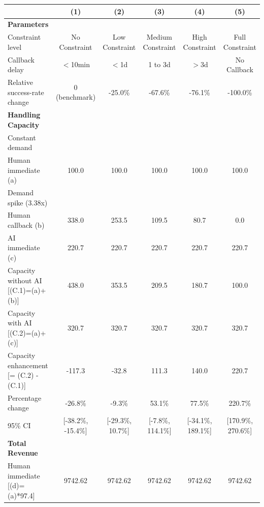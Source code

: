 \begin{tabular}{lccccc}
\toprule
 & (1) & (2) & (3) & (4) & (5) \\
\midrule
\textbf{Parameters} &  &  &  &  &  \\
\hspace{1em} Constraint level & No Constraint & Low Constraint & Medium Constraint & High Constraint & Full Constraint \\
\hspace{1em} Callback delay & $<$10min & $<$1d & 1 to 3d & $>$3d & No Callback \\
\hspace{1em} Relative success-rate change & 0 (benchmark) & -25.0\% & -67.6\% & -76.1\% & -100.0\% \\
\midrule
\textbf{Handling Capacity} &  &  &  &  &  \\
\hspace{1em} Constant demand &  &  &  &  &  \\
\hspace{2em} Human immediate (a) & 100.0 & 100.0 & 100.0 & 100.0 & 100.0 \\
\hspace{1em} Demand spike (3.38x) &  &  &  &  &  \\
\hspace{2em} Human callback (b) & 338.0 & 253.5 & 109.5 & 80.7 & 0.0 \\
\hspace{2em} AI immediate (c) & 220.7 & 220.7 & 220.7 & 220.7 & 220.7 \\
\hspace{1em} Capacity without AI [(C.1)=(a)+(b)] & 438.0 & 353.5 & 209.5 & 180.7 & 100.0 \\
\hspace{1em} Capacity with AI [(C.2)=(a)+(c)] & 320.7 & 320.7 & 320.7 & 320.7 & 320.7 \\
\hspace{1em} Capacity enhancement [= (C.2) - (C.1)] & -117.3 & -32.8 & 111.3 & 140.0 & 220.7 \\
\hspace{2em} Percentage change & -26.8\% & -9.3\% & 53.1\% & 77.5\% & 220.7\% \\
\hspace{2em} 95\% CI & [-38.2\%, -15.4\%] & [-29.3\%, 10.7\%] & [-7.8\%, 114.1\%] & [-34.1\%, 189.1\%] & [170.9\%, 270.6\%] \\
\midrule
\textbf{Total Revenue} &  &  &  &  &  \\
\hspace{1em} Human immediate [(d)=(a)*97.4] & 9742.62 & 9742.62 & 9742.62 & 9742.62 & 9742.62 \\

\end{tabular}
